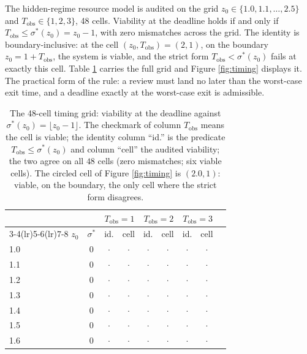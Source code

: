 \documentclass[10pt,twocolumn]{article}
\theoremstyle{definition}
\begin{document}
The hidden-regime resource model is audited on the grid
\(z_0 \in \{1.0, 1.1, \dots, 2.5\}\) and
\(T_{\mathrm{obs}} \in \{1, 2, 3\}\), 48 cells. Viability at the
deadline holds if and only if
\(T_{\mathrm{obs}} \le \sigma^{*}(z_0) = z_0 - 1\), with zero
mismatches across the grid. The identity is boundary-inclusive: at the
cell \((z_0, T_{\mathrm{obs}}) = (2, 1)\), on the boundary
\(z_0 = 1 + T_{\mathrm{obs}}\), the system is viable, and the strict
form \(T_{\mathrm{obs}} < \sigma^{*}(z_0)\) fails at exactly this cell.
Table \ref{tab:timing} carries the full grid and Figure
\ref{fig:timing} displays it. The practical form of the rule: a review
must land no later than the worst-case exit time, and a deadline exactly
at the worst-case exit is admissible.

\begin{table}[t]
\centering
\footnotesize
\caption{The 48-cell timing grid: viability at the deadline against
\(\sigma^{*}(z_0) = \lfloor z_0 - 1 \rfloor\). The checkmark of column
\(T_{\mathrm{obs}}\) means the cell is viable; the identity
column ``id.'' is the predicate
\(T_{\mathrm{obs}} \le \sigma^{*}(z_0)\) and column ``cell'' the audited
viability; the two agree on all \(48\) cells (zero mismatches; six
viable cells). The circled cell of Figure \ref{fig:timing} is
\((2.0, 1)\): viable, on the boundary, the only cell where the strict
form disagrees.}
\label{tab:timing}
\begin{tabular}{@{}l c c cc c cc c@{}}
\toprule
 & & \multicolumn{2}{c}{$T_{\mathrm{obs}} = 1$} &
\multicolumn{2}{c}{$T_{\mathrm{obs}} = 2$} &
\multicolumn{2}{c}{$T_{\mathrm{obs}} = 3$}\\
\cmidrule(lr){3-4}\cmidrule(lr){5-6}\cmidrule(lr){7-8}
$z_0$ & $\sigma^{*}$ & id. & cell & id. & cell & id. & cell\\
\midrule
1.0 & 0 & $\cdot$ & $\cdot$ & $\cdot$ & $\cdot$ & $\cdot$ & $\cdot$\\
1.1 & 0 & $\cdot$ & $\cdot$ & $\cdot$ & $\cdot$ & $\cdot$ & $\cdot$\\
1.2 & 0 & $\cdot$ & $\cdot$ & $\cdot$ & $\cdot$ & $\cdot$ & $\cdot$\\
1.3 & 0 & $\cdot$ & $\cdot$ & $\cdot$ & $\cdot$ & $\cdot$ & $\cdot$\\
1.4 & 0 & $\cdot$ & $\cdot$ & $\cdot$ & $\cdot$ & $\cdot$ & $\cdot$\\
1.5 & 0 & $\cdot$ & $\cdot$ & $\cdot$ & $\cdot$ & $\cdot$ & $\cdot$\\
1.6 & 0 & $\cdot$ & $\cdot$ & $\cdot$ & $\cdot$ & $\cdot$ & $\cdot$\\

\end{tabular}
\end{table}
\end{document}

